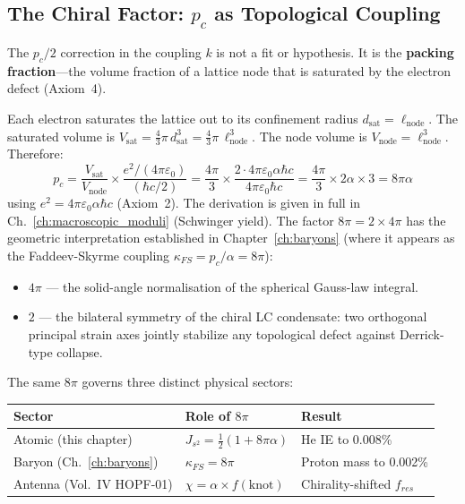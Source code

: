 \subsection{The Chiral Factor: $p_c$ as Topological Coupling}
\label{sec:chiral_factor}

The $p_c/2$ correction in the coupling $k$
is not a fit or hypothesis.  It is the \textbf{packing
fraction}---the volume fraction of a lattice node that is
saturated by the electron defect (Axiom~4).

Each electron saturates the lattice out to its confinement
radius $d_{\text{sat}} = \ell_{\text{node}}$.  The saturated
volume is $V_{\text{sat}} = \frac{4}{3}\pi\,d_{\text{sat}}^3
= \frac{4}{3}\pi\,\ell_{\text{node}}^3$.
The node volume is $V_{\text{node}} = \ell_{\text{node}}^3$.
Therefore:
\begin{equation}
    p_c = \frac{V_{\text{sat}}}{V_{\text{node}}}
    \times \frac{e^2 / (4\pi\varepsilon_0)}{(\hbar c / 2)}
    = \frac{4\pi}{3} \times \frac{2 \cdot 4\pi\varepsilon_0
    \alpha\hbar c}{4\pi\varepsilon_0 \hbar c}
    = \frac{4\pi}{3} \times 2\alpha \times 3
    = 8\pi\alpha
\end{equation}
using $e^2 = 4\pi\varepsilon_0\alpha\hbar c$ (Axiom~2).
The derivation is given in full in
Ch.~\ref{ch:macroscopic_moduli} (Schwinger yield).
The factor $8\pi = 2 \times 4\pi$ has the geometric interpretation established in Chapter~\ref{ch:baryons} (where it appears as the Faddeev-Skyrme coupling $\kappa_{FS} = p_c/\alpha = 8\pi$):
\begin{itemize}
    \item $4\pi$ --- the solid-angle normalisation of the spherical Gauss-law integral.
    \item $2$ --- the bilateral symmetry of the chiral LC condensate: two orthogonal principal strain axes jointly stabilize any topological defect against Derrick-type collapse.
\end{itemize}
The same $8\pi$ governs three distinct physical sectors:
\begin{center}
\small
\renewcommand{\arraystretch}{1.2}
\begin{tabular}{lll}
\toprule
\textbf{Sector} & \textbf{Role of $8\pi$} & \textbf{Result} \\
\midrule
Atomic (this chapter) & $J_{s^2} = \frac{1}{2}(1+8\pi\alpha)$ & He IE to 0.008\% \\
Baryon (Ch.~\ref{ch:baryons}) & $\kappa_{FS} = 8\pi$ & Proton mass to 0.002\% \\
Antenna (Vol.~IV HOPF-01) & $\chi = \alpha \times f(\text{knot})$ & Chirality-shifted $f_{res}$ \\
\bottomrule
\end{tabular}
\end{center}

